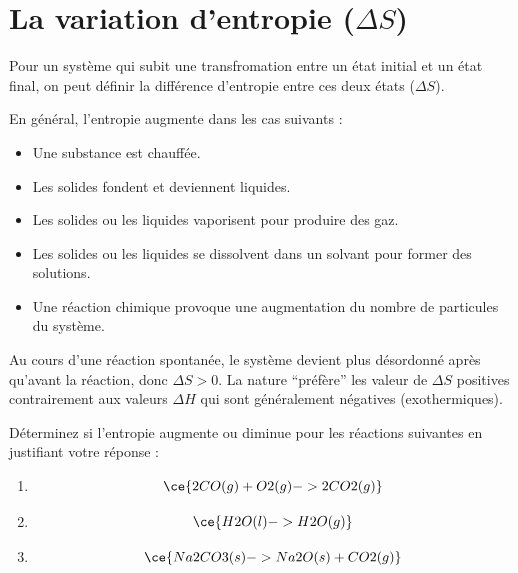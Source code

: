\documentclass[
  11pt,
  a4paper,
  openany]{book}
\providecommand{\tightlist}{%
  \setlength{\itemsep}{0pt}\setlength{\parskip}{0pt}}
\begin{document}
\hypertarget{la-variation-dentropie-delta-s}{%
\section{\texorpdfstring{La variation d'entropie (\(\Delta S\))}{La variation d'entropie (\textbackslash Delta S)}}\label{la-variation-dentropie-delta-s}}

Pour un système qui subit une transfromation entre un état initial et un état final, on peut définir la différence d'entropie entre ces deux états (\(\Delta S\)).

En général, l'entropie augmente dans les cas suivants :

\begin{itemize}
\tightlist
\item
  Une substance est chauffée.
\item
  Les solides fondent et deviennent liquides.
\item
  Les solides ou les liquides vaporisent pour produire des gaz.
\item
  Les solides ou les liquides se dissolvent dans un solvant pour former des solutions.
\item
  Une réaction chimique provoque une augmentation du nombre de particules du système.
\end{itemize}

Au cours d'une réaction spontanée, le système devient plus désordonné après qu'avant la réaction, donc \(\Delta S > 0\). La nature ``préfère'' les valeur de \(\Delta S\) positives contrairement aux valeurs \(\Delta H\) qui sont généralement négatives (exothermiques).

\begin{Exercise}

Déterminez si l'entropie augmente ou diminue pour les réactions suivantes en justifiant votre réponse :

\begin{enumerate}
\def\labelenumi{\alph{enumi}.}
\tightlist
\item
  \[ \ce{2 CO(g) + O2(g) -> 2 CO2(g)} \]
\item
  \[ \ce{H2O(l) -> H2O(g)} \]
\item
  \[ \ce{Na2CO3(s) -> Na2O(s) +CO2(g)} \]
\end{enumerate}

\end{Exercise}
\end{document}
